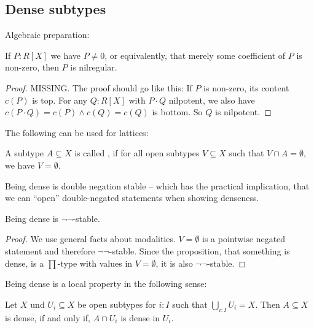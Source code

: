 \subsection{Dense subtypes}

Algebraic preparation:

\begin{lemma}%
  \label{nilregular-non-zero-polynomial}
  If $P:R[X]$ we have $P\neq 0$, or equivalently,
  that merely some coefficient of $P$ is non-zero,
  then $P$ is nilregular.
\end{lemma}

\begin{proof}
  MISSING.
  The proof should go like this: If $P$ is non-zero, its content $c(P)$ is top.
  For any $Q:R[X]$ with $P\cdot Q$ nilpotent, we also have $c(P\cdot Q)=c(P)\wedge c(Q)=c(Q)$ is bottom.
  So $Q$ is nilpotent.
\end{proof}

The following can be used for lattices:

\begin{definition}
  A subtype $A\subseteq X$ is called ,
  if for all open subtypes $V\subseteq X$ such that $V\cap A=\emptyset$, we have $V=\emptyset$.
\end{definition}

Being dense is double negation stable --
which has the practical implication,
that we can ``open'' double-negated statements when showing denseness.

\begin{proposition}%
  \label{dense-double-negation-stable}
  Being dense is $\neg\neg$-stable.
\end{proposition}

\begin{proof}
  We use general facts about modalities.
  $V=\emptyset$ is a pointwise negated statement and therefore $\neg\neg$-stable.
  Since the proposition, that something is dense, is a $\prod$-type with values in $V=\emptyset$, it is also $\neg\neg$-stable.
\end{proof}

Being dense is a local property in the following sense:

\begin{lemma}%
  \label{dense-local}
  Let $X$ und $U_i\subseteq X$ be open subtypes for $i:I$ such that $\bigcup_{i:I}U_i=X$.
  Then $A\subseteq X$ is dense, if and only if, $A\cap U_i$ is dense in $U_i$.
\end{lemma}

